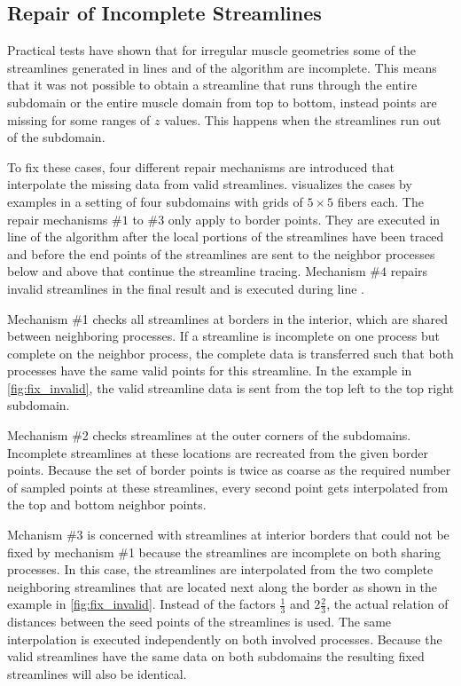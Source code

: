 \subsection{Repair of Incomplete Streamlines}

Practical tests have shown that for irregular muscle geometries some of the streamlines generated in lines  and  of the algorithm are incomplete. This means that it was not possible to obtain a streamline that runs through the entire subdomain or the entire muscle domain from top to bottom, instead points are missing for some ranges of $z$ values. This happens when the streamlines run out of the subdomain.

To fix these cases, four different repair mechanisms are introduced that interpolate the missing data from valid streamlines.  visualizes the cases by examples in a setting of four subdomains with grids of $5 \times 5$ fibers each. The repair mechanisms $\#1$ to $\#3$ only apply to border points. They are executed in line  of the algorithm after the local portions of the streamlines have been traced and before the end points of the streamlines are sent to the neighbor processes below and above that continue the streamline tracing. Mechanism $\#4$ repairs invalid streamlines in the final result and is executed during line .

Mechanism \#1 checks all streamlines at borders in the interior, which are shared between neighboring processes. If a streamline is incomplete on one process but complete on the neighbor process, the complete data is transferred such that both processes have the same valid points for this streamline. In the example in \cref{fig:fix_invalid}, the valid streamline data is sent from the top left to the top right subdomain.

Mechanism \#2 checks streamlines at the outer corners of the subdomains. Incomplete streamlines at these locations are recreated from the given border points. Because the set of border points is twice as coarse as the required number of sampled points at these streamlines, every second point gets interpolated from the top and bottom neighbor points.

Mchanism \#3 is concerned with streamlines at interior borders that could not be fixed by mechanism \#1 because the streamlines are incomplete on both sharing processes. In this case, the streamlines are interpolated from the two complete neighboring streamlines that are located next along the border as shown in the example in \cref{fig:fix_invalid}. Instead of the factors $\frac13$ and $2\frac23$, the actual relation of distances between the seed points of the streamlines is used. The same interpolation is executed independently on both involved processes. Because the valid streamlines have the same data on both subdomains the resulting fixed streamlines will also be identical.

